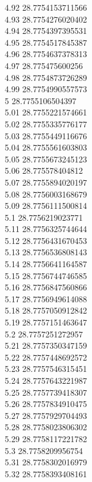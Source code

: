 {4.92	28.7754153711566\\
4.93	28.7754276020402\\
4.94	28.7754397395531\\
4.95	28.7754517845387\\
4.96	28.7754637378313\\
4.97	28.775475600256\\
4.98	28.7754873726289\\
4.99	28.7754990557573\\
5	28.7755106504397\\
5.01	28.7755221574661\\
5.02	28.7755335776177\\
5.03	28.7755449116676\\
5.04	28.7755561603803\\
5.05	28.7755673245123\\
5.06	28.775578404812\\
5.07	28.7755894020197\\
5.08	28.7756003168679\\
5.09	28.7756111500814\\
5.1	28.7756219023771\\
5.11	28.7756325744644\\
5.12	28.7756431670453\\
5.13	28.7756536808143\\
5.14	28.7756641164587\\
5.15	28.7756744746585\\
5.16	28.7756847560866\\
5.17	28.7756949614088\\
5.18	28.7757050912842\\
5.19	28.7757151463647\\
5.2	28.7757251272957\\
5.21	28.7757350347159\\
5.22	28.7757448692572\\
5.23	28.7757546315451\\
5.24	28.7757643221987\\
5.25	28.7757739418307\\
5.26	28.7757834910475\\
5.27	28.7757929704493\\
5.28	28.7758023806302\\
5.29	28.7758117221782\\
5.3	28.7758209956754\\
5.31	28.7758302016979\\
5.32	28.7758393408161\\
}
